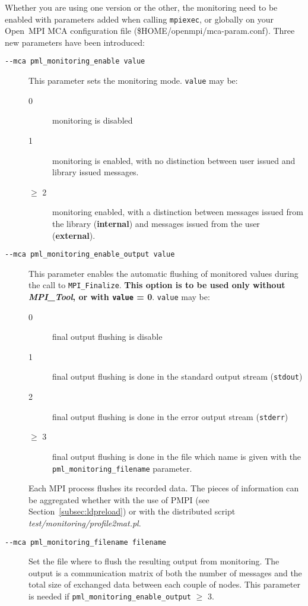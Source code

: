 \documentclass[notitlepage]{article}
\newcommand{\mpit}[1]{\textit{MPI\_Tool#1}}
\newcommand{\ompi}[0]{Open~MPI}
\newcommand{\brkunds}[0]{\allowbreak\_}
\begin{document}
Whether you are using one version or the other, the monitoring need to
be enabled with parameters added when calling \texttt{mpiexec}, or
globally on your \ompi{} MCA configuration file
(\${HOME}/openmpi/mca-param.conf).  Three new parameters have been
introduced:
\begin{description}
\item [\texttt{-{}-mca pml\brkunds{}monitoring\brkunds{}enable value}]
  This parameter sets the monitoring mode. \texttt{value} may be:
  \begin{description}
  \item [0] monitoring is disabled
  \item [1] monitoring is enabled, with no distinction between user
    issued and library issued messages.
  \item [$\ge$ 2] monitoring enabled, with a distinction between
    messages issued from the library ({\bf internal}) and messages
    issued from the user ({\bf external}).
  \end{description}
\item [\texttt{-{}-mca
    pml\brkunds{}monitoring\brkunds{}enable\brkunds{}output value}]
  This parameter enables the automatic flushing of monitored values
  during the call to \texttt{MPI\brkunds{}Finalize}. {\bf This option
    is to be used only without \mpit{}, or with \texttt{value} =
    0}. \texttt{value} may be:
  \begin{description}
  \item [0] final output flushing is disable
  \item [1] final output flushing is done in the standard output
    stream (\texttt{stdout})
  \item [2] final output flushing is done in the error output stream
    (\texttt{stderr})
  \item [$\ge$ 3] final output flushing is done in the file which name
    is given with the
    \texttt{pml\brkunds{}monitoring\brkunds{}filename} parameter.
  \end{description}
  Each MPI process flushes its recorded data. The pieces of
  information can be aggregated whether with the use of PMPI (see
  Section~\ref{subsec:ldpreload}) or with the distributed script {\it
    test/monitoring/profile2mat.pl}.
\item [\texttt{-{}-mca pml\brkunds{}monitoring\brkunds{}filename
    filename}] Set the file where to flush the resulting output from
  monitoring. The output is a communication matrix of both the number
  of messages and the total size of exchanged data between each couple
  of nodes. This parameter is needed if
  \texttt{pml\brkunds{}monitoring\brkunds{}enable\brkunds{}output}
  $\ge$ 3.
\end{description}
\end{document}

